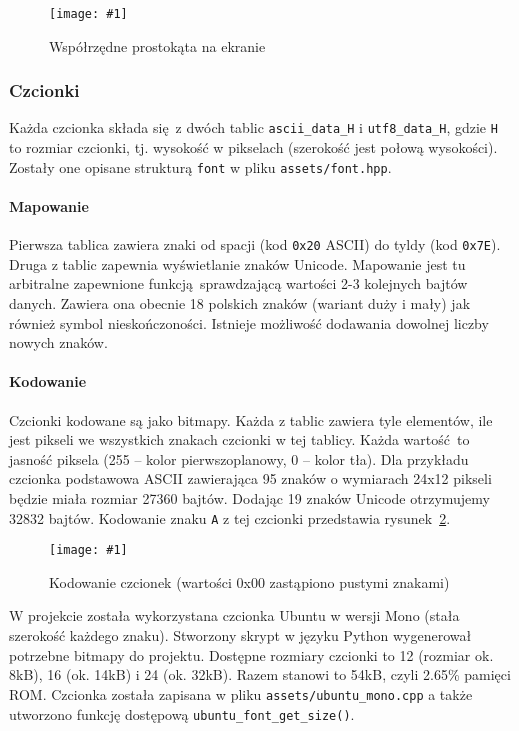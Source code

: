 \documentclass[polish]{aghengthesis}
\newcommand{\imgint}[4]{
	\begin{figure}[{#4}]
		\centering
		\texttt{[image: \#1]}
		\caption{#2}
		\label{#1}
	\end{figure}
}
\newcommand{\imgh}[3]{\imgint{#1}{#2}{#3}{H}}
\begin{document}
				\imgh{3/PicoRadio-screen-rect}{Współrzędne prostokąta na ekranie}{0.6}
			
			\subsubsection{Czcionki}
				Każda czcionka składa się z dwóch tablic \lstinline|ascii_data_H| i \lstinline|utf8_data_H|, gdzie \lstinline|H| to rozmiar czcionki, tj. wysokość w pikselach (szerokość jest połową wysokości). Zostały one opisane strukturą \lstinline|font| w pliku \lstinline|assets/font.hpp|.
				
				\paragraph{Mapowanie}
					Pierwsza tablica zawiera znaki od spacji (kod \lstinline|0x20| ASCII) do tyldy (kod \lstinline|0x7E|). Druga z tablic zapewnia wyświetlanie znaków Unicode. Mapowanie jest tu arbitralne zapewnione funkcją sprawdzającą wartości 2-3 kolejnych bajtów danych. Zawiera ona obecnie 18 polskich znaków (wariant duży i mały) jak również symbol nieskończoności. Istnieje możliwość dodawania dowolnej liczby nowych znaków.
				
				\paragraph{Kodowanie}
					Czcionki kodowane są jako bitmapy. Każda z tablic zawiera tyle elementów, ile jest pikseli we wszystkich znakach czcionki w tej tablicy. Każda wartość to jasność piksela (255 -- kolor pierwszoplanowy, 0 -- kolor tła). Dla przykładu czcionka podstawowa ASCII zawierająca 95 znaków o wymiarach 24x12 pikseli będzie miała rozmiar 27360 bajtów. Dodając 19 znaków Unicode otrzymujemy 32832 bajtów. Kodowanie znaku \lstinline|A| z tej czcionki przedstawia rysunek~\ref{3/PicoRadio-screen-font}.
				
				\imgh{3/PicoRadio-screen-font}{Kodowanie czcionek (wartości 0x00 zastąpiono pustymi znakami)}{0.6}
				
				W projekcie została wykorzystana czcionka Ubuntu\textsuperscript{\cite{ubuntu_font}} w wersji Mono (stała szerokość każdego znaku). Stworzony skrypt w języku Python wygenerował potrzebne bitmapy do projektu. Dostępne rozmiary czcionki to 12 (rozmiar ok. 8kB), 16 (ok. 14kB) i 24 (ok. 32kB). Razem stanowi to 54kB, czyli 2.65\% pamięci ROM. Czcionka została zapisana w pliku \lstinline|assets/ubuntu_mono.cpp| a także utworzono funkcję dostępową \lstinline|ubuntu_font_get_size()|. 
				
\end{document}
